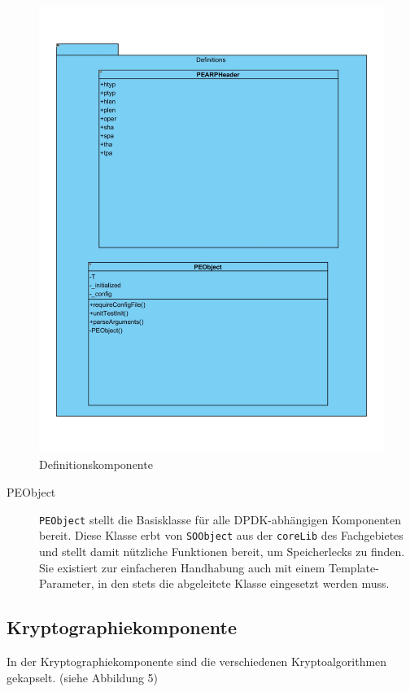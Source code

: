 \documentclass[a4paper, 11pt, ngerman, fleqn]{article}
\begin{document}
\begin{figure}
	\begin{center}
		\includegraphics[width=1 \textwidth]{figures/Definitions.pdf}
		\caption{Definitionskomponente}
	\end{center}
\end{figure}

\begin{description}
	\item[PEObject] 
	\texttt{PEObject} stellt die Basisklasse für alle DPDK-abhängigen Komponenten bereit.
	Diese Klasse erbt von \texttt{SOObject} aus der \texttt{coreLib} des Fachgebietes und stellt damit nützliche Funktionen bereit, um Speicherlecks zu finden.
	Sie existiert zur einfacheren Handhabung auch mit einem Template-Parameter, in den stets die abgeleitete Klasse eingesetzt werden muss. 
\end{description}

\subsection{Kryptographiekomponente}
In der Kryptographiekomponente sind die verschiedenen Kryptoalgorithmen gekapselt. (siehe Abbildung 5)
\end{document}
